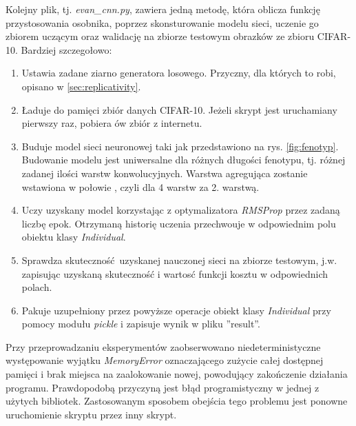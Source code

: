 Kolejny plik, tj. \textit{evan\_cnn.py}, zawiera jedną metodę, która oblicza funkcję przystosowania osobnika, poprzez skonsturowanie modelu sieci, uczenie go zbiorem uczącym oraz walidację na zbiorze testowym obrazków ze zbioru CIFAR-10.
Bardziej szczegołowo:
\begin{enumerate}
  \item Ustawia zadane ziarno generatora losowego. Przyczny, dla których to robi, opisano w \ref{sec:replicativity}.
  \item Ładuje do pamięci zbiór danych CIFAR-10. Jeżeli skrypt jest uruchamiany pierwszy raz, pobiera ów zbiór z internetu.
  \item Buduje model sieci neuronowej taki jak przedstawiono na rys. \ref{fig:fenotyp}.
        Budowanie modelu jest uniwersalne dla różnych długości fenotypu, tj. różnej zadanej ilości warstw konwolucyjnych.
        Warstwa agregująca zostanie wstawiona w połowie , czyli dla 4 warstw za 2. warstwą.
  \item Uczy uzyskany model korzystając z optymalizatora \textit{RMSProp} przez zadaną liczbę epok. Otrzymaną historię uczenia przechwouje w odpowiednim polu obiektu klasy \textit{Individual}.\label{list:training}
  \item Sprawdza skuteczność uzyskanej nauczonej sieci na zbiorze testowym, j.w. zapisując uzyskaną skuteczność i wartosć funkcji kosztu w odpowiednich polach.\label{list:check}
  \item Pakuje uzupełniony przez powyższe operacje obiekt klasy \textit{Individual} przy pomocy modułu \textit{pickle} i zapisuje wynik w pliku ''result''.
\end{enumerate}

Przy przeprowadzaniu eksperymentów zaobserwowano niedeterministyczne występowanie wyjątku \textit{MemoryError} oznaczającego zużycie całej dostępnej pamięci i brak miejsca na zaalokowanie nowej, powodujący zakończenie działania programu.
Prawdopodobą przyczyną jest błąd programistyczny w jednej z użytych bibliotek.
Zastosowanym sposobem obejścia tego problemu jest ponowne uruchomienie skryptu przez inny skrypt.

